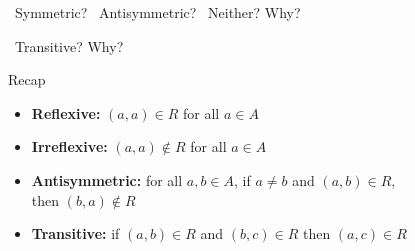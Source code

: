 \documentclass[a4paper,12pt]{book}
\newcounter{question}
\begin{document}
\begin{questionNOGRADE}{\thequestion}
        \Square\ Symmetric? \tab
        \Square\ Antisymmetric? \tab
        \Square\ Neither? \tab Why?

        \Square\ Transitive? \tab Why?
        
    \end{questionNOGRADE}

\newpage

    \begin{intro}{Recap}
        \begin{itemize}
            \item   \textbf{Reflexive:}         $(a,a) \in R$ for all $a \in A$
            \item   \textbf{Irreflexive:}       $(a,a) \not\in R$ for all $a \in A$
            \item   \textbf{Antisymmetric:}     for all $a,b \in A$, if $a \neq b$ and $(a,b) \in R$, \\ then $(b,a) \not\in R$
            \item   \textbf{Transitive:}        if $(a,b) \in R$ and $(b,c) \in R$ then $(a,c) \in R$
        \end{itemize}
    \end{intro}
\end{document}
